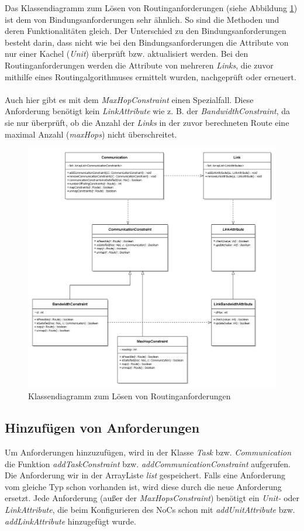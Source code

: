 Das Klassendiagramm zum Lösen von Routinganforderungen (siehe Abbildung \ref{fig:klRoute}) ist dem von Bindungsanforderungen sehr ähnlich. So sind die Methoden und deren Funktionalitäten gleich. Der Unterschied zu den Bindungsanforderungen besteht darin, dass nicht wie bei den Bindungsanforderungen die Attribute von nur einer Kachel (\textit{Unit}) überprüft bzw. aktualisiert werden. Bei den Routinganforderungen werden die Attribute von mehreren \textit{Links}, die zuvor mithilfe eines Routingalgorithmuses ermittelt  wurden, nachgeprüft oder erneuert. \\
\\
Auch hier gibt es mit dem \textit{MaxHopConstraint} einen Spezialfall. Diese Anforderung benötigt kein \textit{LinkAttribute} wie z. B. der  \textit{BandwidthConstraint}, da sie nur überprüft, ob die Anzahl der \textit{Links} in der zuvor berechneten Route eine maximal Anzahl (\textit{maxHops}) nicht überschreitet.
\begin{figure}[H]\centering
  \includegraphics[width = 150mm]{bilder/communication-link.jpg}
  \caption{Klassendiagramm zum Lösen von Routinganforderungen}\label{fig:klRoute}
\end{figure}

\subsection{Hinzufügen von Anforderungen}
Um Anforderungen hinzuzufügen, wird in der Klasse \textit{Task} bzw. \textit{Communication} die Funktion \textit{addTaskConstraint} bzw. \textit{addCommunicationConstraint} aufgerufen. Die Anforderung wir in der ArrayListe \textit{list} gespeichert. Falls eine Anforderung vom gleiche Typ schon vorhanden ist, wird diese durch die neue Anforderung ersetzt. Jede Anforderung (außer der \textit{MaxHopsConstraint}) benötigt ein \textit{Unit-} oder \textit{LinkAttribute}, die beim Konfigurieren des NoCs schon mit \textit{addUnitAttribute} bzw. \textit{addLinkAttribute} hinzugefügt wurde.

